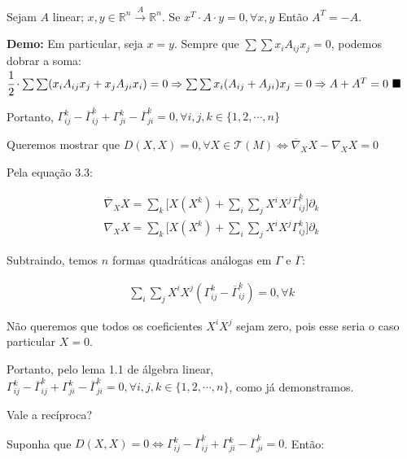 \documentclass[10pt,a4paper]{article}
\begin{document}
		Sejam $A$ linear; $x, y \in \mathbb{R}^n \stackrel{A}{\longrightarrow} \mathbb{R}^n$. Se $x^T \cdot A \cdot y = 0, \forall x, y$ Ent\~ao $A^T = -A$.

		\vspace{3mm}

		\textbf{Demo:} Em particular, seja $x = y$. Sempre que $\sum \sum x_i A_{ij} x_j = 0$, podemos dobrar a soma: $\cfrac{1}{2} \cdot \sum \sum (x_i A_{ij} x_j + x_j A_{ji} x_i) = 0 \Rightarrow \sum \sum x_i (A_{ij} + A_{ji}) x_j = 0 \Rightarrow A + A^T = 0 \,\,\blacksquare$

		\vspace{12mm}

		Portanto,	$\Gamma_{ij}^k - \overline{\Gamma}_{ij}^k + \Gamma_{ji}^k - \overline{\Gamma}_{ji}^k = 0, \forall i,j,k \in \{ 1, 2, \cdots, n \}$

		\vspace{3mm}

		Queremos mostrar que $D(X, X) = 0, \forall X \in \mathcal{T}(M) \Leftrightarrow  \overline{\nabla}_X X - \nabla_X X = 0$

		Pela equa\c{c}\~ao 3.3:

		\begin{align*}
  		\overline{\nabla}_X X = \sum_k \bigg[ X(X^k) + \sum_i \sum_j X^i X^j \overline{\Gamma}_{ij}^k \bigg] \partial_k \\
  		\nabla_X X = \sum_k \bigg[ X(X^k) + \sum_i \sum_j X^i X^j \Gamma_{ij}^k \bigg] \partial_k
		\end{align*}

		Subtraindo, temos $n$ formas quadr\'aticas an\'alogas em $\Gamma$ e $\overline{\Gamma}$:

		\begin{align*}
  		\sum_i \sum_j X^i X^j ( \Gamma_{ij}^k - \overline{\Gamma}_{ij}^k ) = 0, \forall k
		\end{align*}

		N\~ao queremos que todos os coeficientes $X^i X^j$ sejam zero, pois esse seria o caso particular $X = 0$.

		Portanto, pelo lema 1.1 de \'algebra linear,	$\Gamma_{ij}^k - \overline{\Gamma}_{ij}^k + \Gamma_{ji}^k - \overline{\Gamma}_{ji}^k = 0, \forall i,j,k \in \{ 1, 2, \cdots, n \}$, como j\'a demonstramos.

		\vspace{12mm}

		Vale a rec\'iproca?

		Suponha que $D(X, X) = 0 \Leftrightarrow \Gamma_{ij}^k - \overline{\Gamma}_{ij}^k + \Gamma_{ji}^k - \overline{\Gamma}_{ji}^k = 0$. Ent\~ao:
\end{document}
